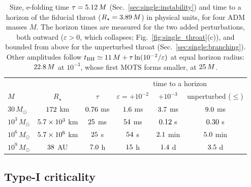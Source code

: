 \documentclass[twocolumn,floatfix,aps,prd,superscriptaddress,nofootinbib,showkeys]{revtex4-2}
\begin{document}
\begin{table}[t]
\caption{Size, e-folding time $\tau=5.12\,M$ (Sec.~\ref{sec:single:instability}) and time to a horizon of the fiducial throat ($R_\star=3.89\,M$) in physical units, for four ADM masses $M$. The horizon times are measured for the two added perturbations, both outward ($\varepsilon>0$, which collapses; Fig.~\ref{fig:single_throat}(c)), and bounded from above for the unperturbed throat (Sec.~\ref{sec:single:branching}). Other amplitudes follow $t_{\rm BH}\simeq11\,M+\tau\ln(10^{-2}/\varepsilon)$ at equal horizon radius: $22.8\,M$ at $10^{-3}$, whose first MOTS forms smaller, at $25\,M$.}
\label{tab:scales}
\scriptsize
\begin{ruledtabular}
\begin{tabular}{lccccc}
 & & & \multicolumn{3}{c}{time to a horizon} \\
$M$ & $R_\star$ & $\tau$ & $\varepsilon=+10^{-2}$ & $+10^{-3}$ & unperturbed ($\le$) \\
\hline
$30\,M_\odot$ & $172$ km & $0.76$ ms & $1.6$ ms & $3.7$ ms & $9.0$ ms \\
$10^{3}\,M_\odot$ & $5.7\times10^{3}$ km & $25$ ms & $54$ ms & $0.12$ s & $0.30$ s \\
$10^{6}\,M_\odot$ & $5.7\times10^{6}$ km & $25$ s & $54$ s & $2.1$ min & $5.0$ min \\
$10^{9}\,M_\odot$ & $38$ AU & $7.0$ h & $15$ h & $1.4$ d & $3.5$ d \\
\end{tabular}
\end{ruledtabular}
\end{table}

\subsection{Type-I criticality}
\label{sec:single:critical}
\end{document}
